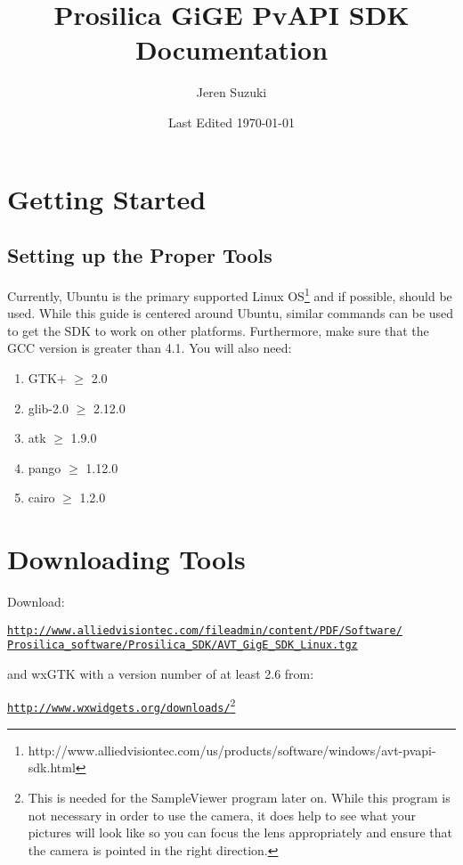 \documentclass[10pt]{scrartcl}
\title{Prosilica GiGE PvAPI SDK Documentation}
\author{Jeren Suzuki}
\date{Last Edited \today}
\begin{document}
\maketitle
{}
\tableofcontents
\newpage
{}


\section{Getting Started}
\subsection{Setting up the Proper Tools}

Currently, Ubuntu is the primary supported Linux OS\footnote{http://www.alliedvisiontec.com/us/products/software/windows/avt-pvapi-sdk.html} and if possible, should be used. While this guide is centered around Ubuntu, similar commands can be used to get the SDK to work on other platforms. Furthermore, make sure that the GCC version is greater than 4.1. You will also need:

\begin{enumerate}
    \item GTK$+$ $\ge$ 2.0
    \item glib-2.0 $\ge$ 2.12.0
    \item atk $\ge$ 1.9.0
    \item pango $\ge$ 1.12.0
    \item cairo $\ge$ 1.2.0
\end{enumerate}

\section{Downloading Tools}
Download:


\href{http://www.alliedvisiontec.com/fileadmin/content/PDF/Software/
Prosilica_software/Prosilica\_SDK/AVT_GigE\_SDK_Linux.tgz}{\texttt{http://www.alliedvisiontec.com/fileadmin/content/PDF/Software/\\ 
Prosilica\_software/Prosilica\_SDK/AVT\_GigE\_SDK\_Linux.tgz}}


and wxGTK with a version number of at least 2.6 from:

\href{http://www.wxwidgets.org/downloads/}{\texttt{http://www.wxwidgets.org/downloads/}}\footnote{This is needed for the SampleViewer program later on. While this program is not necessary in order to use the camera, it does help to see what your pictures will look like so you can focus the lens appropriately and ensure that the camera is pointed in the right direction.}
\end{document}
